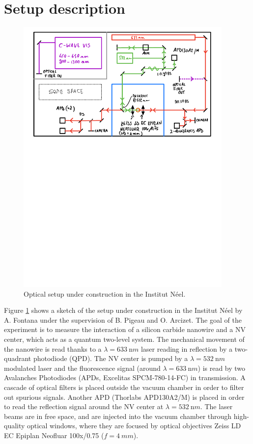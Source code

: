 \documentclass{article}
\begin{document}
\section{Setup description}

\begin{figure}[ht!]
	\includegraphics[width=0.95\textwidth]{figures/Schema.pdf}
	\caption{\label{figSetup1} Optical setup under construction in the Institut N\'eel.}
\end{figure}

Figure \ref{figSetup1} shows a sketch of the setup under construction in the Institut N\'eel by A. Fontana under the supervision of B. Pigeau and O. Arcizet. The goal of the experiment is to measure the  interaction of a silicon carbide nanowire and a NV center, which acts as a quantum two-level system. The mechanical movement of the nanowire is read thanks to a $\lambda=\SI{633}{\nano m}$ laser reading in reflection by a two-quadrant photodiode (QPD). The NV center is pumped by a $\lambda=\SI{532}{\nano m}$ modulated laser and the fluorescence signal (around $\lambda=\SI{633}{\nano m}$) is read by two Avalanches Photodiodes (APDs, Excelitas SPCM-780-14-FC) in transmission. A cascade of optical filters is placed outside the vacuum chamber in order to filter out spurious signals. Another APD (Thorlabs APD130A2/M) is placed in order to read the reflection signal around the NV center at $\lambda=\SI{532}{\nano m}$. The laser beams are in free space, and are injected into the vacuum chamber through high-quality optical windows, where they are focused by optical objectives Zeiss LD EC Epiplan Neofluar 100x/0.75 ($f=\SI{4}{mm}$).
\end{document}
